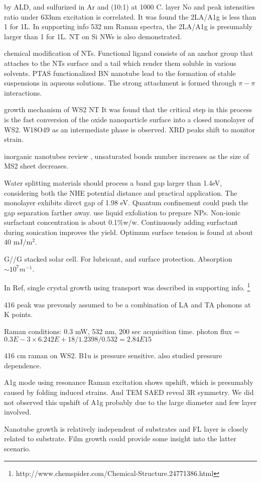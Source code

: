 \cite{Song2013}  by ALD, and sulfurized in Ar and  (10:1) at 1000 C.  layer No and peak intensities ratio under 633nm excitation is correlated. It was found the 2LA/A1g is less than 1 for 1L. In supporting info 532 nm Raman spectra, the 2LA/A1g is presumably larger than 1 for 1L.  NT on Si NWs is also demonstrated.

\cite{Tenne2010} chemical modification of NTs. Functional ligand consists of an anchor group that attaches to the NTs surface and a tail which render them soluble in various solvents. PTAS functionalized BN nanotube lead to the formation of stable suspensions in aqueous solutions. The strong attachment is formed through $\pi-\pi$ interactions.

growth mechanism of WS2 NT\cite{ZAK2009} 
It was found that the critical step in this process is the fast conversion of the oxide nanoparticle surface into a closed monolayer of WS2. W18O49 as an intermediate phase is observed. XRD peaks shift to monitor strain. 

inorganic nanotubes review \cite{Tenne2004} , unsaturated bonds number increases as the size of MS2 sheet decreases.

Water splitting materials should process a band gap larger than 1.4eV, considering both the NHE potential distance and practical application. The monolayer  exhibits direct gap of 1.98 eV. Quantum confinement could push the gap separation farther away. \cite{wilcoxon1997} \citeauthor{Notley2013} use liquid exfoliation to prepare  NPs.\cite{Notley2013} Non-ionic surfactant concentration is about 0.1\%w/w. Continuously adding surfactant during sonication improves the yield. Optimum surface tension is found at about 40 mJ/m$^2$.

G//G stacked solar cell. For lubricant, and surface protection. Absorption $\sim 10^7 m^{-1}$. \cite{Britnell2013}

In Ref\cite{Zeng2013}, single crystal  growth using  transport was described in supporting info.
\footnote{http://www.chemspider.com/Chemical-Structure.24771386.html}



416 peak was prevously assumed to be a combination of LA and TA phonons at K points.

Raman conditions: 0.3 mW, 532 nm, 200 sec acquisition time. photon flux = $0.3E-3\times6.242E+18/1.2398/0.532=2.84E15$

416 cm raman on WS2. B1u is pressure sensitive. \cite{Staiger2012} also studied pressure dependence.

A1g mode using resonance Raman excitation shows upshift, which is presumably caused by folding induced strains. And TEM SAED reveal 3R symmetry. We did not observed this upshift of A1g probably due to the large diameter and few layer involved.

Nanotube growth is relatively independent of substrates and FL layer is closely related to substrate. Film growth could provide some insight into the latter scenario.

